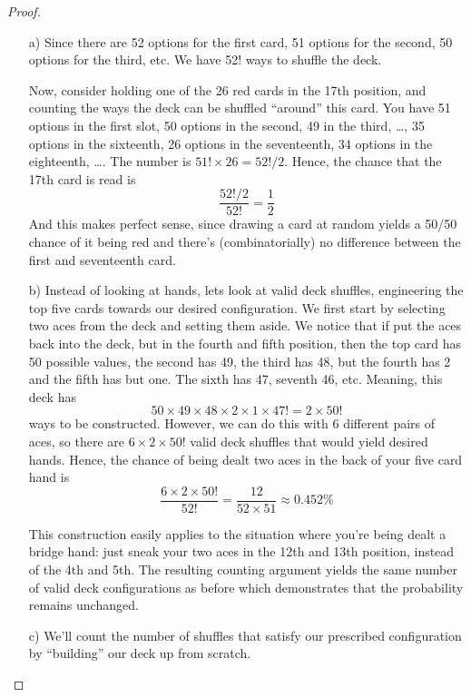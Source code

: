 \documentclass[12pt,titlepage]{article}
\begin{document}
\begin{proof}
\begin{enumerate}
\item[a)] Since there are 52 options for the first card, 51 options for the second, 50 options for the third, etc. We have 52$!$ ways to shuffle the deck. 

Now, consider holding one of the 26 red cards in the 17th position, and counting the ways the deck can be shuffled ``around'' this card. You have 51 options in the first slot, 50 options in the second, 49 in the third, \ldots, 35 options in the sixteenth, 26 options in the seventeenth, 34 options in the eighteenth, \ldots. The number is $51! \times 26 = 52!/2$. Hence, the chance that the 17th card is read is 
\[
\frac{52!/2}{52!} = \frac{1}{2}
\]
And this makes perfect sense, since drawing a card at random yields a 50/50 chance of it being red and there's (combinatorially) no difference between the first and seventeenth card.
\item[b)] 
Instead of looking at hands, lets look at valid deck shuffles, engineering the top five cards towards our desired configuration. We first start by selecting two aces from the deck and setting them aside. We notice that if put the aces back into the deck, but in the fourth and fifth position, then the top card has 50 possible values, the second has 49, the third has 48, but the fourth has 2 and the fifth has but one. The sixth has 47, seventh 46, etc. Meaning, this deck has
\[
50 \times 49 \times 48 \times 2 \times 1 \times 47! = 2 \times 50!
\]
ways to be constructed. However, we can do this with 6 different pairs of aces, so there are $6 \times 2 \times 50!$ valid deck shuffles that would yield desired hands. Hence, the chance of being dealt two aces in the back of your five card hand is
\[
\frac{6 \times 2 \times 50!}{52!} = \frac{12}{52\times 51} \approx 0.452\%
\]

This construction easily applies to the situation where you're being dealt a bridge hand: just sneak your two aces in the 12th and 13th position, instead of the 4th and 5th. The resulting counting argument yields the same number of valid deck configurations as before which demonstrates that the probability remains unchanged.
\item[c)] We'll count the number of shuffles that satisfy our prescribed configuration by ``building'' our deck up from scratch. 


\end{enumerate}
\end{proof}
\end{document}
